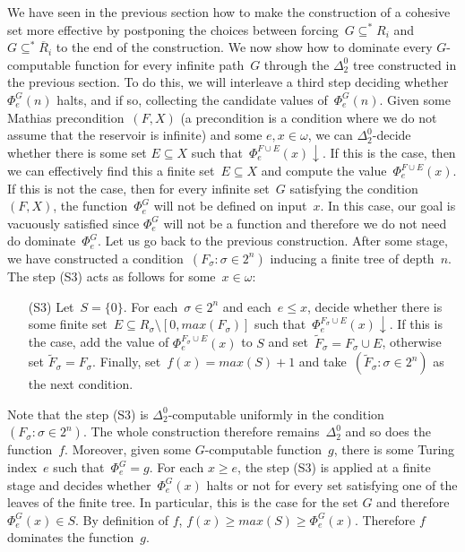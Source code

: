 We have seen in the previous section how to make the construction of a cohesive set more effective
by postponing the choices between forcing~$G \subseteq^{*} R_i$ and~$G \subseteq^{*} \overline{R}_i$
to the end of the construction. We now show how to dominate every $G$-computable function
for every infinite path~$G$ through the $\Delta^0_2$ tree constructed in the previous section.
To do this, we will interleave a third step deciding whether $\Phi^G_e(n)$ halts, and if so, collecting the 
candidate values of~$\Phi^G_e(n)$.
Given some Mathias precondition~$(F, X)$ (a precondition is a condition 
where we do not assume that the reservoir is infinite) and some $e,x \in \omega$, we can $\Delta^0_2$-decide 
whether there is some set $E \subseteq X$ such that~$\Phi^{F \cup E}_e(x) \downarrow$.
If this is the case, then we can effectively find this a finite set~$E \subseteq X$ and
compute the value~$\Phi^{F \cup E}_e(x)$. If this is not the case, then for every infinite set~$G$ satisfying
the condition~$(F, X)$, the function~$\Phi^G_e$ will not be defined on input~$x$. In this case,
our goal is vacuously satisfied since $\Phi^G_e$ will not be a function and therefore
we do not need do dominate~$\Phi^G_e$. 
Let us go back to the previous construction.
After some stage, we have constructed a condition~$(F_\sigma : \sigma \in 2^n)$ inducing a finite tree of depth~$n$. 
The step (S3) acts as follows for some~$x \in \omega$:
\begin{itemize}
	\item[(S3)] Let~$S = \{0\}$. For each~$\sigma \in 2^n$ and each~$e \leq x$, decide whether 
	there is some finite set~$E \subseteq R_\sigma \setminus [0, max(F_\sigma)]$ such that~$\Phi^{F_\sigma \cup E}_e(x) \downarrow$.
	If this is the case, add the value of $\Phi^{F_\sigma \cup E}_e(x)$ to $S$ and set~$\tilde{F}_\sigma = F_\sigma \cup E$, otherwise set $\tilde{F}_\sigma = F_\sigma$.
	Finally, set~$f(x) = max(S)+1$ and take~$(\tilde{F}_\sigma : \sigma \in 2^n)$ as the next condition.
\end{itemize}
Note that the step (S3) is $\Delta^0_2$-computable uniformly in the condition~$(F_\sigma : \sigma \in 2^n)$.
The whole construction therefore remains~$\Delta^0_2$ and so does the function~$f$.
Moreover, given some $G$-computable function~$g$, there is some Turing index~$e$ such that~$\Phi^G_e = g$.
For each $x \geq e$, the step (S3) is applied at a finite stage and decides whether~$\Phi^G_e(x)$ halts or not
for every set satisfying one of the leaves of the finite tree. In particular, this is the case for the set $G$ and 
therefore $\Phi^G_e(x) \in S$. By definition of $f$, $f(x) \geq max(S) \geq \Phi^G_e(x)$. Therefore $f$ dominates the function~$g$.

